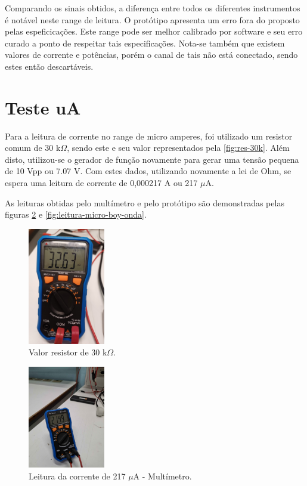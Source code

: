 Comparando os sinais obtidos, a diferença entre todos os diferentes instrumentos é notável neste range de leitura. O protótipo apresenta um erro fora do proposto pelas espeficicações. Este range pode ser melhor calibrado por software e seu erro curado a ponto de respeitar tais especificações. Nota-se também que existem valores de corrente e potências, porém o canal de tais não está conectado, sendo estes então descartáveis.

\section{Teste uA}\label{teste-ua}

Para a leitura de corrente no range de micro amperes, foi utilizado um resistor comum de 30 k$\Omega$, sendo este e seu valor representados pela \autoref{fig:res-30k}. Além disto, utilizou-se o gerador de função novamente para gerar uma tensão pequena de 10 Vpp ou 7.07 V. Com estes dados, utilizando novamente a lei de Ohm, se espera uma leitura de corrente de 0,000217 A ou 217 $\mu$A.

As leituras obtidas pelo multímetro e pelo protótipo são demonstradas pelas figuras \ref{fig:leitura-micro-mult} e \ref{fig:leitura-micro-boy-onda}.

\begin{figure}[htb!]
    \caption{Valor resistor de 30 k$\Omega$.}
    \label{fig:res-30k}
    \includegraphics[width=0.3\textwidth]{figuras/res-30k.png}
    \fonte{}
\end{figure}

\begin{figure}[htb!]
    \caption{Leitura da corrente de 217 $\mu$A - Multímetro.}
    \label{fig:leitura-micro-mult}
    \includegraphics[width=0.3\textwidth]{figuras/leitura-micro-mult.jpg}
    \fonte{}
\end{figure}

